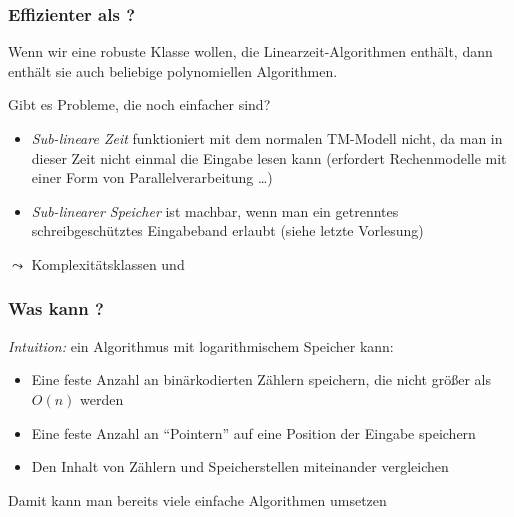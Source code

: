 \documentclass[aspectratio=1610,onlymath]{beamer}
\begin{document}
\begin{frame}\frametitle{Effizienter als ?}

Wenn wir eine robuste Klasse wollen, die Linearzeit-Algorithmen enthält, dann enthält sie auch beliebige polynomiellen Algorithmen.\bigskip

\alert{Gibt es Probleme, die noch einfacher sind?}
\smallskip\pause

\begin{itemize}
\item \emph{Sub-lineare Zeit} funktioniert mit dem normalen TM-Modell nicht, da man
in dieser Zeit nicht einmal die Eingabe lesen kann {\tiny (erfordert Rechenmodelle mit einer Form von Parallelverarbeitung \ldots)}
\item \emph{Sub-linearer Speicher} ist machbar, wenn man ein getrenntes schreibgeschütztes Eingabeband erlaubt (siehe letzte Vorlesung)
\end{itemize}
$\leadsto$ Komplexitätsklassen  und 

\end{frame}

\begin{frame}\frametitle{Was kann ?}

\emph{Intuition:} ein Algorithmus mit logarithmischem Speicher kann:
\begin{itemize}
\item Eine feste Anzahl an binärkodierten Zählern speichern, die nicht größer als $O(n)$ werden
\item Eine feste Anzahl an "`Pointern"' auf eine Position der Eingabe speichern
\item Den Inhalt von Zählern und Speicherstellen miteinander vergleichen
\end{itemize}

Damit kann man bereits viele einfache Algorithmen umsetzen\pause


\end{frame}
\end{document}
